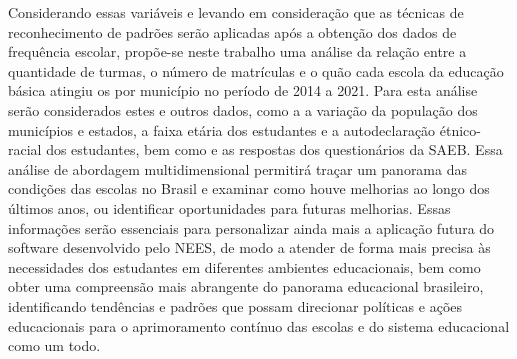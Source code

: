 \begin{enumerate}
\end{enumerate}

Considerando essas variáveis e levando em consideração que as técnicas de reconhecimento de padrões serão aplicadas após a obtenção dos dados de frequência escolar, propõe-se neste trabalho uma análise da relação entre a quantidade de turmas, o número de matrículas e o quão cada escola da educação básica atingiu os  por município no período de 2014 a 2021. Para esta análise serão considerados estes e outros dados, como a a variação da população dos municípios e estados, a faixa etária dos estudantes e a autodeclaração étnico-racial dos estudantes, bem como e as respostas dos questionários da SAEB. Essa análise de abordagem multidimensional permitirá traçar um panorama das condições das escolas no Brasil e examinar como houve melhorias ao longo dos últimos anos, ou identificar oportunidades para futuras melhorias. Essas informações serão essenciais para personalizar ainda mais a aplicação futura do software desenvolvido pelo NEES, de modo a atender de forma mais precisa às necessidades dos estudantes em diferentes ambientes educacionais, bem como obter uma compreensão mais abrangente do panorama educacional brasileiro, identificando tendências e padrões que possam direcionar políticas e ações educacionais para o aprimoramento contínuo das escolas e do sistema educacional como um todo.

